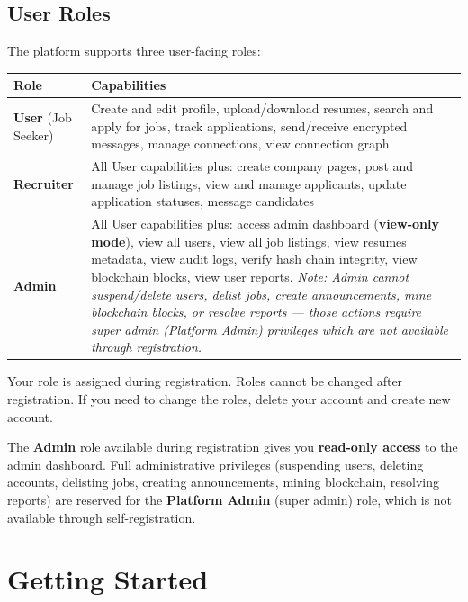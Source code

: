 \documentclass[12pt,a4paper]{article}
\begin{document}
\subsection{User Roles}

The platform supports three user-facing roles:

\begin{longtable}{p{3cm}p{10cm}}
\toprule
\textbf{Role} & \textbf{Capabilities} \\
\midrule
\textbf{User} (Job Seeker) & Create and edit profile, upload/download resumes, search and apply for jobs, track applications, send/receive encrypted messages, manage connections, view connection graph \\
\midrule
\textbf{Recruiter} & All User capabilities plus: create company pages, post and manage job listings, view and manage applicants, update application statuses, message candidates \\
\midrule
\textbf{Admin} & All User capabilities plus: access admin dashboard (\textbf{view-only mode}), view all users, view all job listings, view resumes metadata, view audit logs, verify hash chain integrity, view blockchain blocks, view user reports. \textit{Note: Admin cannot suspend/delete users, delist jobs, create announcements, mine blockchain blocks, or resolve reports --- those actions require super admin (Platform Admin) privileges which are not available through registration.} \\
\bottomrule
\end{longtable}

\begin{infobox}
Your role is assigned during registration. Roles cannot be changed after registration. If you need to change the roles, delete your account and create new account.

The \textbf{Admin} role available during registration gives you \textbf{read-only access} to the admin dashboard. Full administrative privileges (suspending users, deleting accounts, delisting jobs, creating announcements, mining blockchain, resolving reports) are reserved for the \textbf{Platform Admin} (super admin) role, which is not available through self-registration.
\end{infobox}


\section{Getting Started}
\end{document}
